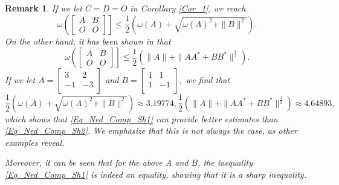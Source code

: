 \documentclass[12pt,twoside,reqno]{amsart}
\newtheorem{remark}{Remark}[section]
\numberwithin{equation}{section}
\begin{document}
\begin{remark}
If we let $C=D=O$ in Corollary \ref{Cor_1}, we reach
\begin{equation}\label{Eq_Ned_Comp_Sh1}
\omega\left(\left[\begin{matrix}A&B\\O&O\end{matrix}\right]\right]\leq \frac{1}{2}\left(\omega(A)+\sqrt{\omega(A)^2+\|B\|^2}\right).
\end{equation}
On the other hand, it has been shown in \cite{Shebrawi_LAA_2017} that
\begin{equation}\label{Eq_Ned_Comp_Sh2}
\omega\left(\left[\begin{matrix}A&B\\O&O\end{matrix}\right]\right]\leq \frac{1}{2}\left(\|A\|+\|AA^*+BB^*\|^{\frac{1}{2}}\right).
\end{equation}
If we let $A=\left[
\begin{array}{cc}
 3 & 2 \\
 -1 & -3 \\
\end{array}
\right]$ and $B=\left[
\begin{array}{cc}
 1 & 1 \\
 1 & -1 \\
\end{array}
\right],$ we find that
\[\frac{1}{2}\left(\omega(A)+\sqrt{\omega(A)^2+\|B\|^2}\right)\approx 3.19774, \frac{1}{2}\left(\|A\|+\|AA^*+BB^*\|^{\frac{1}{2}}\right)\approx 4.64893,\]
which shows that \eqref{Eq_Ned_Comp_Sh1} can provide better estimates than \eqref{Eq_Ned_Comp_Sh2}. We emphasize that this is not always the case, as other examples reveal.

Moreover, it can be seen that for the above $A$ and $B$, the inequality \eqref{Eq_Ned_Comp_Sh1} is indeed an equality, showing that it is a sharp inequality.

\end{remark}
\end{document}
